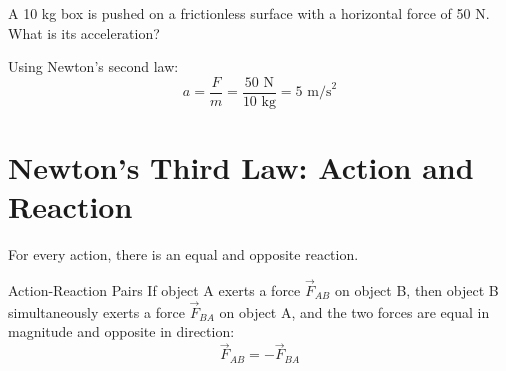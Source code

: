 \documentclass[11pt, a4paper]{article}
\begin{document}
\begin{example}
    A 10 kg box is pushed on a frictionless surface with a horizontal force of 50 N. What is its acceleration?
    \begin{center}
    \end{center}
    
    Using Newton's second law:
    $$ a = \frac{F}{m} = \frac{50 \text{ N}}{10 \text{ kg}} = 5 \text{ m/s}^2 $$
\end{example}

\section{Newton's Third Law: Action and Reaction}

For every action, there is an equal and opposite reaction.

\begin{theorem}{Action-Reaction Pairs}
    If object A exerts a force $\vec{F}_{AB}$ on object B, then object B simultaneously exerts a force $\vec{F}_{BA}$ on object A, and the two forces are equal in magnitude and opposite in direction:
    $$ \vec{F}_{AB} = -\vec{F}_{BA} $$
\end{theorem}

\lipsum[1-2] %
\end{document}
